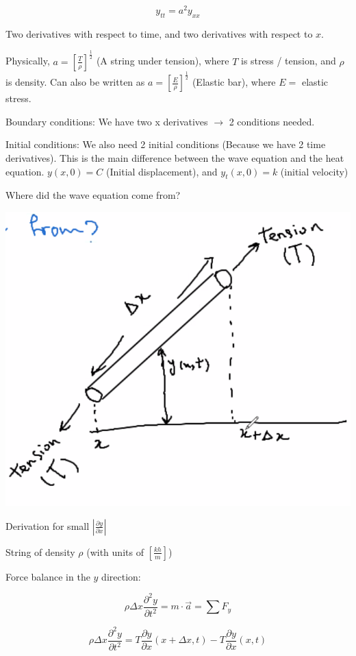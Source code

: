 \documentclass{article}
\begin{document}
$$y_{tt} = a^2 y_{xx}$$

Two derivatives with respect to time, and two derivatives with respect to $x$. 

Physically, $a = \left[ \frac{T}{\rho} \right]^{\frac{1}{2}}$ (A string under tension), where $T$ is stress / tension, and $\rho$ is density. Can also be written as $a = \left[ \frac{E}{\rho} \right]^{\frac{1}{2}}$ (Elastic bar), where $E = $ elastic stress. 

Boundary conditions: We have two x derivatives $\to$ 2 conditions needed. 

Initial conditions: We also need 2 initial conditions (Because we have 2 time derivatives). This is the main difference between the wave equation and the heat equation.  $y(x,0) = C$ (Initial displacement), and $y_t(x,0) = k$ (initial velocity)

\hfill

Where did the wave equation come from?

\includegraphics[width = 0.9 \textwidth]{image1.png}

Derivation for small $\left| \frac{\partial y}{\partial x} \right|$

String of density $\rho$ (with units of $\left[ \frac{kh}{m} \right]$)

Force balance in the $y$ direction:

$$\rho \Delta x \frac{\partial^2 y}{\partial t^2} = m \cdot \vec{a} = \sum F_y$$


$$\rho \Delta x \frac{\partial^2 y}{\partial t^2} = T \frac{\partial y}{\partial x} \left( x + \Delta x, t \right) - T \frac{\partial y}{\partial x} (x,t)$$
\end{document}
